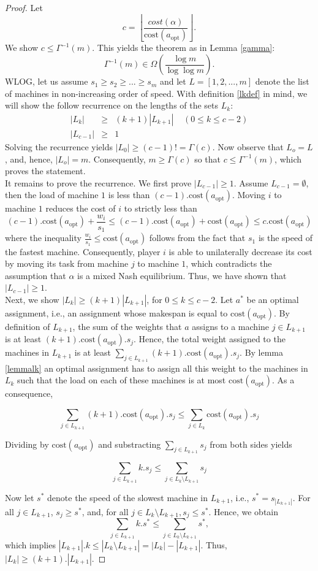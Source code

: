 \documentclass[a4paper,11pt]{article}
\newcommand{\cost}{\text{cost}}
\newcommand{\opt}{\text{opt}}
\newcommand{\copt}{\cost(a_{\opt})}
\begin{document}
\begin{proof}
Let $$c = \left\lfloor\frac{cost(\alpha)}{\cost(a_{\opt})}\right\rfloor.$$
We show $c \leq \Gamma^{-1}(m)$. This yields the theorem as in Lemma \ref{gamma}:
$$ \Gamma^{-1}(m) \in \Omega\left(\frac{\log m}{\log \log m}\right).$$
WLOG, let us assume $s_1 \geq s_2 \geq ... \geq s_m$ and let $L = [1,2,...,m]$ denote the list of machines in non-increasing order of speed. With definition \ref{lkdef} in mind, we will show the follow recurrence on the lengths of the sets $L_k$:
\begin{eqnarray*}
  |L_k| &\geq& (k+1)|L_{k+1}|  \;\;\; \; (0\leq k \leq c-2)\\
  |L_{c-1}| &\geq& 1
\end{eqnarray*}
Solving the recurrence yields $|L_0| \geq (c-1)! = \Gamma(c)$. Now observe that $L_o = L$, and, hence, $|L_o| = m$. Consequently, $m \geq \Gamma(c)$ so that $c \leq \Gamma^{-1}(m)$, which proves the statement.\\

It remains to prove the recurrence. We first prove $|L_{c-1}| \geq 1$. Assume $L_{c-1} = \emptyset$, then the load of machine $1$ is less than $(c-1).\copt$. Moving $i$ to machine $1$ reduces the cost of $i$ to strictly less than
$$(c-1).\copt+\frac{w_i}{s_1} \leq (c-1).\copt + \copt \leq c.\copt$$
where the inequality $\frac{w_i}{s_1} \leq \copt$ follows from the fact that $s_1$ is the speed of the fastest machine. Consequently, player $i$ is able to unilaterally decrease its cost by moving its task from machine $j$ to machine $1$, which contradicts the assumption that $\alpha$ is a mixed Nash equilibrium. Thus, we have shown that $|L_{c-1}| \geq 1$.\\

Next, we show $|L_k| \geq (k+1)|L_{k+1}|$, for $0\leq k\leq c-2$. Let $a^*$ be an optimal assignment, i.e., an assignment whose makespan is equal to $\copt$. By definition of $L_{k+1}$, the sum of the weights that $a$ assigns to a machine $j \in L_{k+1}$ is at least $(k+1).\copt.s_j$. Hence, the total weight assigned to the machines in $L_{k+1}$ is at least $\sum_{j\in L_{k+1}}(k+1).\copt.s_j$. By lemma \ref{lemmalk} an optimal assignment has to assign all this weight to the machines in $L_k$ such that the load on each of these machines is at most $\copt$. As a consequence,

$$\displaystyle\sum_{j\in L_{k+1}}(k+1).\copt.s_j \leq \displaystyle\sum_{j\in L_k}\copt.s_j$$

Dividing by $\copt$ and substracting $\sum_{j\in L_{k+1}}s_j$ from both sides yields

$$\displaystyle\sum_{j\in L_{k+1}}k.s_j \leq \displaystyle\sum_{j\in L_k\setminus L_{k+1}}s_j$$

Now let $s^*$ denote the speed of the slowest machine in $L_{k+1}$, i.e., $s^*=s_{|L_{k+1}|}$. For all $j \in L_{k+1}$, $s_j\geq s^*$, and, for all $j \in L_k\setminus L_{k+1}, s_j\leq s^*$. Hence, we obtain
$$\displaystyle\sum_{j\in L_{k+1}}k.s^* \leq \sum_{j\in L_k\setminus L_{k+1}}s^*,$$
which implies $|L_{k+1}|.k \leq |L_k\setminus L_{k+1}| = |L_k|-|L_{k+1}|$. Thus, $|L_k| \geq (k+1).|L_{k+1}|$.
\end{proof}
\end{document}
